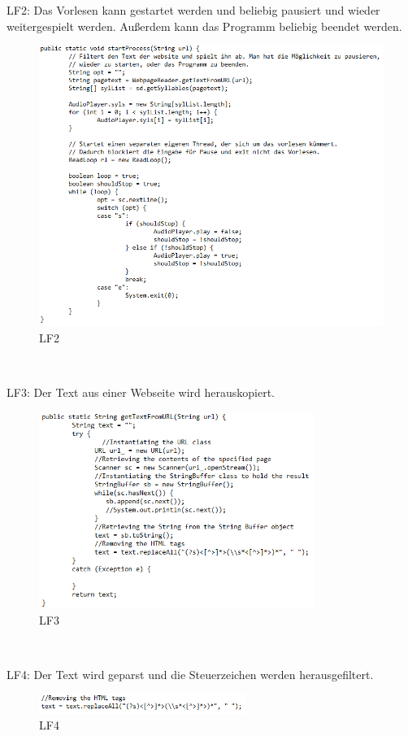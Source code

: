 \documentclass[12pt]{scrartcl}
\begin{document}
\newpage

LF2: Das Vorlesen kann gestartet werden und beliebig pausiert und wieder weitergespielt werden. Außerdem kann das Programm beliebig beendet werden.
\begin{figure}[hp!]
 \centering
 \includegraphics[width=1.0\textwidth]{res/LF2}
 \caption{LF2}
 \label{fig: fig2}
\end{figure}
~

\newpage

LF3: Der Text aus einer Webseite wird herauskopiert.
\begin{figure}[hp!]
 \centering
 \includegraphics[width=0.8\textwidth]{res/LF3}
 \caption{LF3}
 \label{fig: fig3}
\end{figure}
~

\newpage

LF4: Der Text wird geparst und die Steuerzeichen werden herausgefiltert.
\begin{figure}[hp!]
 \centering
 \includegraphics[width=0.6\textwidth]{res/LF4}
 \caption{LF4}
 \label{fig: fig4}
\end{figure}
~
\end{document}
